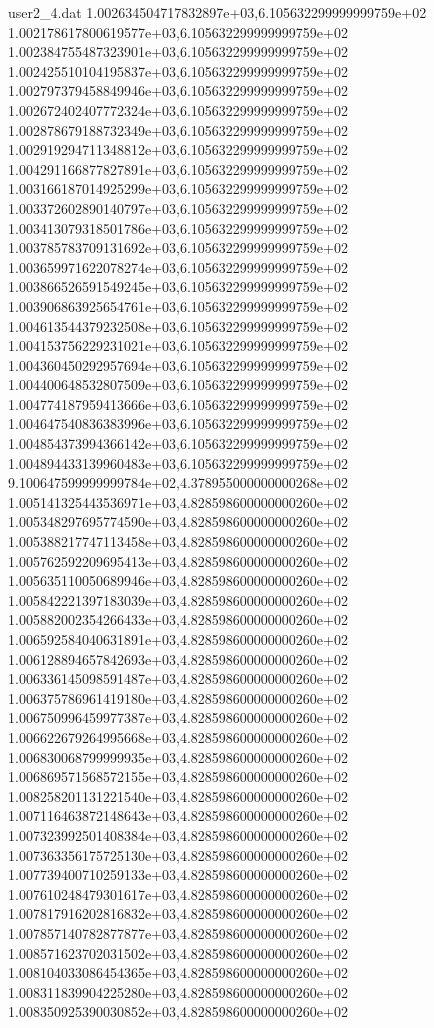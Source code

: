 \begin{filecontents}{user2_4.dat}
1.002634504717832897e+03,6.105632299999999759e+02
1.002178617800619577e+03,6.105632299999999759e+02
1.002384755487323901e+03,6.105632299999999759e+02
1.002425510104195837e+03,6.105632299999999759e+02
1.002797379458849946e+03,6.105632299999999759e+02
1.002672402407772324e+03,6.105632299999999759e+02
1.002878679188732349e+03,6.105632299999999759e+02
1.002919294711348812e+03,6.105632299999999759e+02
1.004291166877827891e+03,6.105632299999999759e+02
1.003166187014925299e+03,6.105632299999999759e+02
1.003372602890140797e+03,6.105632299999999759e+02
1.003413079318501786e+03,6.105632299999999759e+02
1.003785783709131692e+03,6.105632299999999759e+02
1.003659971622078274e+03,6.105632299999999759e+02
1.003866526591549245e+03,6.105632299999999759e+02
1.003906863925654761e+03,6.105632299999999759e+02
1.004613544379232508e+03,6.105632299999999759e+02
1.004153756229231021e+03,6.105632299999999759e+02
1.004360450292957694e+03,6.105632299999999759e+02
1.004400648532807509e+03,6.105632299999999759e+02
1.004774187959413666e+03,6.105632299999999759e+02
1.004647540836383996e+03,6.105632299999999759e+02
1.004854373994366142e+03,6.105632299999999759e+02
1.004894433139960483e+03,6.105632299999999759e+02
9.100647599999999784e+02,4.378955000000000268e+02
1.005141325443536971e+03,4.828598600000000260e+02
1.005348297695774590e+03,4.828598600000000260e+02
1.005388217747113458e+03,4.828598600000000260e+02
1.005762592209695413e+03,4.828598600000000260e+02
1.005635110050689946e+03,4.828598600000000260e+02
1.005842221397183039e+03,4.828598600000000260e+02
1.005882002354266433e+03,4.828598600000000260e+02
1.006592584040631891e+03,4.828598600000000260e+02
1.006128894657842693e+03,4.828598600000000260e+02
1.006336145098591487e+03,4.828598600000000260e+02
1.006375786961419180e+03,4.828598600000000260e+02
1.006750996459977387e+03,4.828598600000000260e+02
1.006622679264995668e+03,4.828598600000000260e+02
1.006830068799999935e+03,4.828598600000000260e+02
1.006869571568572155e+03,4.828598600000000260e+02
1.008258201131221540e+03,4.828598600000000260e+02
1.007116463872148643e+03,4.828598600000000260e+02
1.007323992501408384e+03,4.828598600000000260e+02
1.007363356175725130e+03,4.828598600000000260e+02
1.007739400710259133e+03,4.828598600000000260e+02
1.007610248479301617e+03,4.828598600000000260e+02
1.007817916202816832e+03,4.828598600000000260e+02
1.007857140782877877e+03,4.828598600000000260e+02
1.008571623702031502e+03,4.828598600000000260e+02
1.008104033086454365e+03,4.828598600000000260e+02
1.008311839904225280e+03,4.828598600000000260e+02
1.008350925390030852e+03,4.828598600000000260e+02

\end{filecontents}
